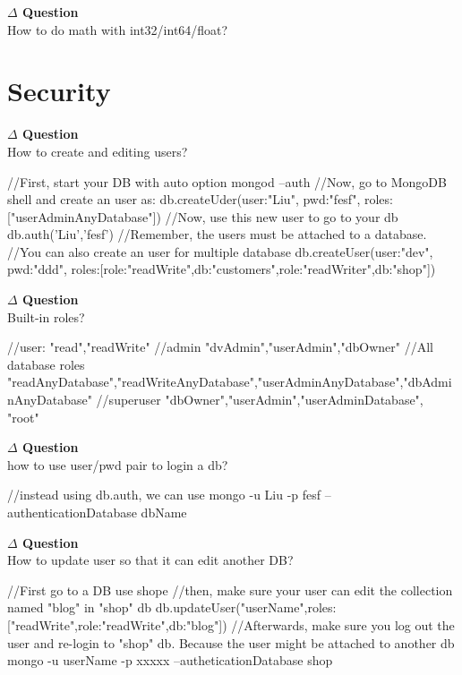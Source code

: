 \documentclass[12pt]{article}
\newenvironment{que}
    { \begin{mdframed}[backgroundcolor=green!20] \textbf{$\Delta$ Question} \\}
    {  \end{mdframed}}
\begin{document}
\begin{que}
How to do math with int32/int64/float?
\end{que}

\newpage
\section{Security}
\begin{que}
How to create and editing users?
\end{que}
\begin{code}
//First, start your DB with auto option
mongod --auth
//Now, go to MongoDB shell and create an user as:
db.createUder({user:"Liu", pwd:"fesf", roles:["userAdminAnyDatabase"]})
//Now, use this new user to go to your db
db.auth('Liu','fesf')
//Remember, the users must be attached to a database.
//You can also create an user for multiple database
db.createUser({user:"dev", pwd:"ddd", roles:[{role:"readWrite",db:"customers"},{role:"readWriter",db:"shop"}]})
\end{code}
\begin{que}
Built-in roles?
\end{que}
\begin{code}
//user:
"read","readWrite"
//admin
"dvAdmin","userAdmin","dbOwner"
//All database roles
"readAnyDatabase","readWriteAnyDatabase","userAdminAnyDatabase","dbAdminAnyDatabase"
//superuser
"dbOwner","userAdmin","userAdminDatabase", "root"
\end{code}
\begin{que}
how to use user/pwd pair to login a db?
\end{que}
\begin{code}
//instead using db.auth, we can use
mongo -u Liu -p fesf --authenticationDatabase dbName
\end{code}
\begin{que}
How to update user so that it can edit another DB?
\end{que}
\begin{code}
//First go to a DB
use shope
//then, make sure your user can edit the collection named "blog" in "shop" db
db.updateUser("userName",{roles:["readWrite",{role:"readWrite",db:"blog"}]})
//Afterwards, make sure you log out the user and re-login to "shop" db. Because the user might be attached to another db
mongo -u userName -p xxxxx --autheticationDatabase shop
\end{code}
\end{document}
